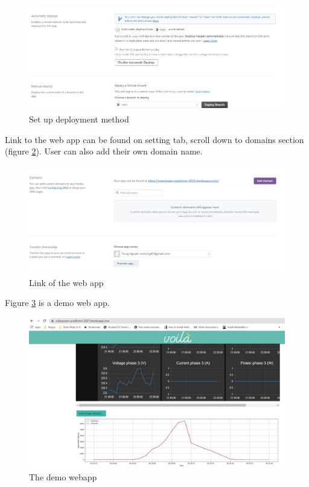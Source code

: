 \begin{figure}[H]
	\centering
    \includegraphics[width=0.8\columnwidth]{Pictures/Heroku_Deployment_methods.jpg}
	\caption[Short title]{Set up deployment method}
	\label{figure:setup deployment method}
\end{figure}

Link to the web app can be found on setting tab, scroll down to domains section (figure \ref{figure:web link}). User can also add their own domain name.

\begin{figure}[H]
	\centering
    \includegraphics[width=0.8\columnwidth]{Pictures/Personal webapp.jpg}
	\caption[Short title]{Link of the web app}
	\label{figure:web link}
\end{figure}

Figure \ref{figure:web app} is a demo web app.

\begin{figure}[H]
	\centering
    \includegraphics[width=0.8\columnwidth]{Pictures/Demo webapp.jpg}
	\caption[Short title]{The demo webapp}
	\label{figure:web app}
\end{figure}

